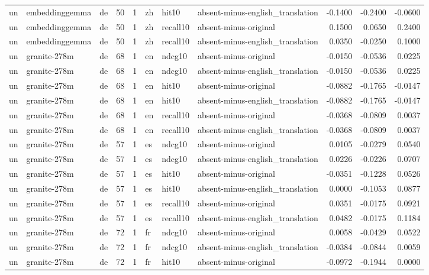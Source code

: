 \begin{tabular}{lllrrlllrrr}
un & embeddinggemma & de & 50 & 1 & zh & hit10 & absent-minus-english\_translation & -0.1400 & -0.2400 & -0.0600 \\
un & embeddinggemma & de & 50 & 1 & zh & recall10 & absent-minus-original & 0.1500 & 0.0650 & 0.2400 \\
un & embeddinggemma & de & 50 & 1 & zh & recall10 & absent-minus-english\_translation & 0.0350 & -0.0250 & 0.1000 \\
un & granite-278m & de & 68 & 1 & en & ndcg10 & absent-minus-original & -0.0150 & -0.0536 & 0.0225 \\
un & granite-278m & de & 68 & 1 & en & ndcg10 & absent-minus-english\_translation & -0.0150 & -0.0536 & 0.0225 \\
un & granite-278m & de & 68 & 1 & en & hit10 & absent-minus-original & -0.0882 & -0.1765 & -0.0147 \\
un & granite-278m & de & 68 & 1 & en & hit10 & absent-minus-english\_translation & -0.0882 & -0.1765 & -0.0147 \\
un & granite-278m & de & 68 & 1 & en & recall10 & absent-minus-original & -0.0368 & -0.0809 & 0.0037 \\
un & granite-278m & de & 68 & 1 & en & recall10 & absent-minus-english\_translation & -0.0368 & -0.0809 & 0.0037 \\
un & granite-278m & de & 57 & 1 & es & ndcg10 & absent-minus-original & 0.0105 & -0.0279 & 0.0540 \\
un & granite-278m & de & 57 & 1 & es & ndcg10 & absent-minus-english\_translation & 0.0226 & -0.0226 & 0.0707 \\
un & granite-278m & de & 57 & 1 & es & hit10 & absent-minus-original & -0.0351 & -0.1228 & 0.0526 \\
un & granite-278m & de & 57 & 1 & es & hit10 & absent-minus-english\_translation & 0.0000 & -0.1053 & 0.0877 \\
un & granite-278m & de & 57 & 1 & es & recall10 & absent-minus-original & 0.0351 & -0.0175 & 0.0921 \\
un & granite-278m & de & 57 & 1 & es & recall10 & absent-minus-english\_translation & 0.0482 & -0.0175 & 0.1184 \\
un & granite-278m & de & 72 & 1 & fr & ndcg10 & absent-minus-original & 0.0058 & -0.0429 & 0.0522 \\
un & granite-278m & de & 72 & 1 & fr & ndcg10 & absent-minus-english\_translation & -0.0384 & -0.0844 & 0.0059 \\
un & granite-278m & de & 72 & 1 & fr & hit10 & absent-minus-original & -0.0972 & -0.1944 & 0.0000 \\

\end{tabular}
